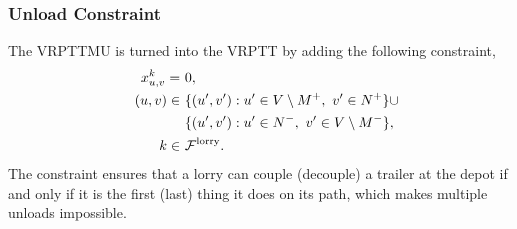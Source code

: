%
%







\subsubsection{Unload Constraint}
The VRPTTMU is turned into the VRPTT by adding the following constraint,
\begin{align}
  \label{con:extra}
  x^{k}_{u,v} = \ &  0, \\
  \quad (u,v) \in \  & \{  (u',v') : u' \in V \setminus  M^+  , \ v' \in N^+  \} \cup \notag \\
   & \{  (u',v') : u' \in N^- , \ v'  \in V \setminus   M^-   \} ,\notag \\
  \ k \in \ & \mathcal{F}^{\rm lorry} . \notag
\end{align}
The constraint ensures that a lorry can couple (decouple) a trailer at the depot if and only if it is the first (last) thing it does on its path, which makes multiple unloads impossible. \\

